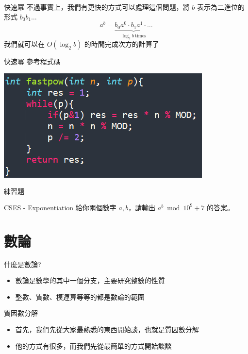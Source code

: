 \documentclass[aspectratio=169]{beamer}
\begin{document}
\begin{frame}{快速冪} 
    不過事實上，我們有更快的方式可以處理這個問題，將 $b$ 表示為二進位的形式 $b_0 b_1 \ldots$
    $$a^b = \underbrace{b_0 a^0 \cdot b_1 a^1 \cdot \dots}_{\log_2{b} \ \text{times}}$$
    我們就可以在 $O(\log_2{b})$ 的時間完成次方的計算了
\end{frame}

\begin{frame}{快速冪} 
    參考程式碼
    \begin{center}
        \includegraphics[]{images/code8.png}
    \end{center}
\end{frame}

\begin{frame}{練習題} 
    \begin{block}{CSES - Exponentiation}
        給你兩個數字 $a,b$，請輸出 $a^b \bmod 10^9+7$ 的答案。
    \end{block}
\end{frame}

\section{數論}

\begin{frame}{什麼是數論?}
    \begin{itemize}
        \item 數論是數學的其中一個分支，主要研究整數的性質
        \item 整數、質數、模運算等等的都是數論的範圍
    \end{itemize}
\end{frame}

\begin{frame}{質因數分解}
    \begin{itemize}
        \item 首先，我們先從大家最熟悉的東西開始談，也就是質因數分解
        \item 他的方式有很多，而我們先從最簡單的方式開始談談
    \end{itemize}
\end{frame}
\end{document}

